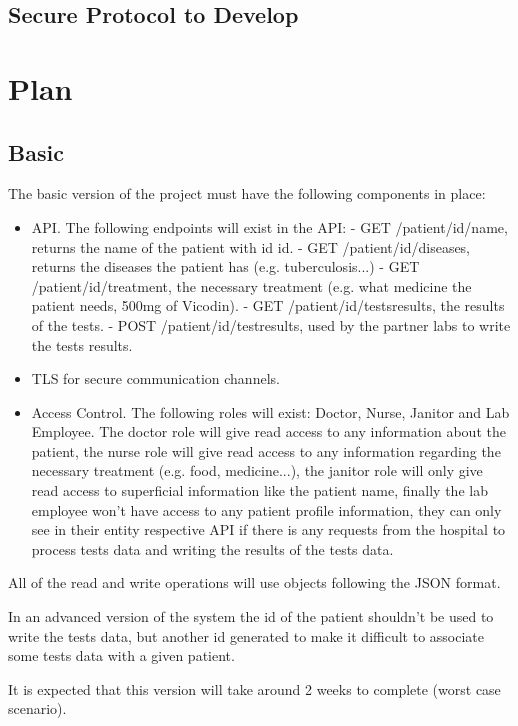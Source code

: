 \subsection{Secure Protocol to Develop}
	

\section{Plan}

\subsection{Basic}
The basic version of the project must have the following components in place:
\begin{itemize}
	\item API.
		\subitem The following endpoints will exist in the API:
		\subitem - GET /patient/{id}/name, returns the name of the patient with id {id}.
		\subitem - GET /patient/{id}/diseases, returns the diseases the patient has (e.g. tuberculosis...)
		\subitem - GET /patient/{id}/treatment, the necessary treatment (e.g. what medicine the patient needs, 500mg of Vicodin).
		\subitem - GET /patient/{id}/testsresults, the results of the tests.
		\subitem - POST /patient/{id}/testresults, used by the partner labs to write the tests results.
	\item TLS for secure communication channels.
	\item Access Control.
		\subitem The following roles will exist: Doctor, Nurse, Janitor and Lab Employee. The doctor role will give read access to any information about the patient, the nurse role will give read access to any information regarding the necessary treatment (e.g. food, medicine...), the janitor role will only give  read access to superficial information like the patient name, finally the lab employee won't have access to any patient profile information, they can only see in their entity respective API if there is any requests from the hospital to process tests data and writing the results of the tests data.
\end{itemize}

All of the read and write operations will use objects following the JSON format.

In an advanced version of the system the id of the patient shouldn't be used to write the tests data, but another id generated to make it difficult to associate some tests data with a given patient.

It is expected that this version will take around 2 weeks to complete (worst case scenario). 


